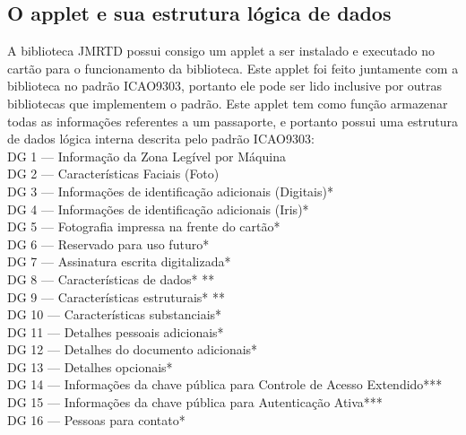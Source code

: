 \documentclass{article}
\begin{document}
	\subsection{O applet e sua estrutura lógica de dados}
		\begin{justify}

			\hspace{2cm} A biblioteca JMRTD possui consigo um applet a ser instalado e executado no cartão para o funcionamento da biblioteca. Este applet foi feito juntamente com a biblioteca no padrão ICAO9303, portanto ele pode ser lido inclusive por outras bibliotecas que implementem o padrão. Este applet tem como função armazenar todas as informações referentes a um passaporte, e portanto possui uma estrutura de dados lógica interna descrita pelo padrão ICAO9303:\\
			
			\hspace*{1.5cm} DG 1 — Informação da Zona Legível por Máquina\\
			\hspace*{2cm} DG 2 — Características Faciais (Foto)\\
			\hspace*{2cm} DG 3 — Informações de identificação adicionais (Digitais)*\\
			\hspace*{2cm} DG 4 — Informações de identificação adicionais (Iris)*\\
			\hspace*{2cm} DG 5 — Fotografia impressa na frente do cartão*\\
			\hspace*{2cm} DG 6 — Reservado para uso futuro*\\
			\hspace*{2cm} DG 7 — Assinatura escrita digitalizada*\\
			\hspace*{2cm} DG 8 — Características de dados* **\\
			\hspace*{2cm} DG 9 — Características estruturais* **\\
			\hspace*{2cm} DG 10 — Características substanciais*\\
			\hspace*{2cm} DG 11 — Detalhes pessoais adicionais*\\
			\hspace*{2cm} DG 12 — Detalhes do documento adicionais*\\
			\hspace*{2cm} DG 13 — Detalhes opcionais*\\
			\hspace*{2cm} DG 14 — Informações da chave pública para Controle de Acesso Extendido***\\
			\hspace*{2cm} DG 15 — Informações da chave pública para Autenticação Ativa***\\
			\hspace*{2cm} DG 16 — Pessoas para contato*\\


\end{justify}
\end{document}
